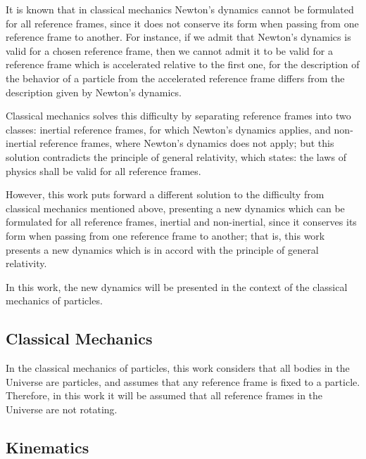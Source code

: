 \documentclass[11pt]{article}
\begin{document}
\par It is known that in classical mechanics Newton's dynamics cannot be formulated for all reference frames, since it does not conserve its form when passing from one reference frame to another. For instance, if we admit that Newton's dynamics is valid for a chosen reference frame, then we cannot admit it to be valid for a reference frame which is accelerated relative to the first one, for the description of the behavior of a particle from the accelerated reference frame differs from the description given by Newton's dynamics.
\medskip
\par Classical mechanics solves this difficulty by separating reference frames into two classes: inertial reference frames, for which Newton's dynamics applies, and non-inertial reference frames, where Newton's dynamics does not apply; but this solution contradicts the principle of general relativity, which states: the laws of physics shall be valid for all reference frames.
\medskip
\par However, this work puts forward a different solution to the difficulty from classical mechanics mentioned above, presenting a new dynamics which can be formulated for all reference frames, inertial and non-inertial, since it conserves its form when passing from one reference frame to another; that is, this work presents a new dynamics which is in accord with the principle of general relativity.
\medskip
\par In this work, the new dynamics will be presented in the context of the classical mechanics of particles.

\newpage

{\centering\subsection*{Classical Mechanics}}

\par In the classical mechanics of particles, this work considers that all bodies in the Universe are particles, and assumes that any reference frame is fixed to a particle. Therefore, in this work it will be assumed that all reference frames in the Universe are not rotating.

\vspace{+0.6em}

{\centering\subsection*{Kinematics}}
\end{document}
